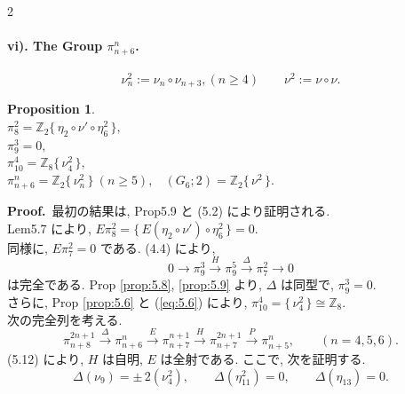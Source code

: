 \documentclass[10pt, leqno]{ltjsarticle}
\newcommand{\gen}[1]{\{\,#1\,\}}       %
\numberwithin{equation}{section}
\theoremstyle{plain}
\newtheorem{proposition}[theorem]{Proposition}
\theoremstyle{definition}
\theoremstyle{remark}
\begin{document}
\begin{paracol}{2}

\paragraph*{vi). The Group \(\pi^{n}_{n+6}\).}
\[
\nu_n^2:=\nu_n\circ\nu_{n+3},(n\ge4)\qquad
\nu^2:=\nu\circ\nu.
\]

\begin{proposition}\label{prop:5.11}
\ \\
\(\pi^{2}_{8}=\mathbb Z_2\gen{\eta_{2}\circ\nu'\circ\eta_6^2},\) \\
\(\pi^{3}_{9}=0,\) \\
\(\pi^{4}_{10}=\mathbb Z_8\gen{\nu_{4}^2},\) \\
\(\pi^{n}_{n+6}=\mathbb Z_2\gen{\nu_n^2}\ (n\ge5),\) \
\((G_{6};2)=\mathbb Z_2\gen{\nu^2}.\)
\end{proposition}

\noindent
\textbf{Proof.}\ 
最初の結果は, Prop5.9 と (5.2) により証明される. \\
Lem5.7 により, \(E\pi_8^2=\gen{E(\eta_2\circ\nu')\circ\eta_6^2}=0 .\)\\
同様に, \(E\pi_7^2=0\) である. 
(4.4) により, 
\[
0\to \pi^{3}_{9}\xrightarrow{H}\pi^{5}_{9}\xrightarrow{\Delta}\pi^{2}_{7}\to 0
\]
は完全である. 
Prop \ref{prop:5.8}, \ref{prop:5.9} より,
\(\Delta\) は同型で, 
\(\pi^{3}_{9}=0 .\)\\
さらに, Prop \ref{prop:5.6} と (\ref{eq:5.6}) により,
\(\pi^{4}_{10}=\gen{\nu_4^{2}}\cong \mathbb Z_8 .\)\\
次の完全列を考える. 
\[
\pi^{2n+1}_{n+8}\xrightarrow{\Delta}\pi^{n}_{n+6}
\xrightarrow{E}\pi^{n+1}_{n+7}\xrightarrow{H}\pi^{2n+1}_{n+7}
\xrightarrow{P}\pi_{n+5}^n, 
\qquad(n=4,5,6) .
\]
(5.12) により, \(H\) は自明, \(E\) は全射である. 
ここで, 次を証明する. 
\begin{equation}\label{eq:5.13}
\Delta(\nu_9)=\pm\,2(\nu_4^{2}),\qquad
\Delta(\eta^{2}_{11})=0,\qquad
\Delta(\eta_{13})=0.
\end{equation}


\end{paracol}
\end{document}
